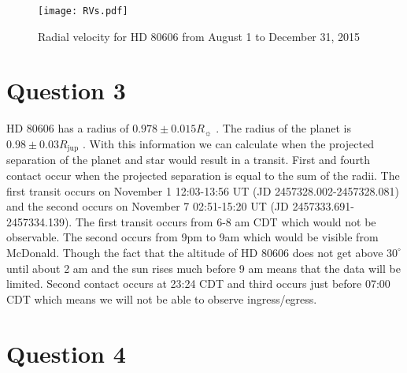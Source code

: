 \documentclass[preprint]{aastex}
\begin{document}
\begin{figure}[h]
\begin{center}
    \texttt{[image: RVs.pdf]}
    \caption{Radial velocity for HD 80606 from August 1 to December 31, 2015}
    \label{fig:RV}
\end{center}
\end{figure}

\section{Question 3}

HD 80606 has a radius of $0.978\pm0.015 R_\sun$ \citep{orbparam}. The radius of the planet is $0.98\pm0.03 R_\mathrm{jup}$ \citep{orbparam}. With this information we can calculate when the projected separation of the planet and star would result in a transit. First and fourth contact occur when the projected separation is equal to the sum of the radii. The first transit occurs on November 1 12:03-13:56 UT (JD 2457328.002-2457328.081) and the second occurs on November 7 02:51-15:20 UT (JD 2457333.691-2457334.139). The first transit occurs from 6-8 am CDT which would not be observable. The second occurs from 9pm to 9am which would be visible from McDonald. Though the fact that the altitude of HD 80606 does not get above $30^\circ$ until about 2 am and the sun rises much before 9 am means that the data will be limited. Second contact occurs at 23:24 CDT and third occurs just before 07:00 CDT which means we will not be able to observe ingress/egress.

\section{Question 4}
\end{document}
